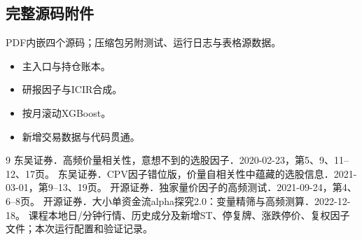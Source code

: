 \documentclass[UTF8,zihao=-4,fontset=fandol]{ctexart}
\begin{document}
\subsection*{完整源码附件}
PDF内嵌四个源码；压缩包另附测试、运行日志与表格源数据。
\begin{itemize}
\item {}\quad 主入口与持仓账本。
\item {}\quad 研报因子与ICIR合成。
\item {}\quad 按月滚动XGBoost。
\item {}\quad 新增交易数据与代码贯通。
\end{itemize}

\begin{thebibliography}{9}\small
{} 东吴证券．高频价量相关性，意想不到的选股因子．2020-02-23，第5、9、11--12、17页。
 东吴证券．CPV因子错位版，价量自相关性中蕴藏的选股信息．2021-03-01，第9--13、19页。
 开源证券．独家量价因子的高频测试．2021-09-24，第4、6--8页。
 开源证券．大小单资金流alpha探究2.0：变量精筛与高频测算．2022-12-18。
 课程本地日/分钟行情、历史成分及新增ST、停复牌、涨跌停价、复权因子文件；本次运行配置和验证记录。
\end{thebibliography}

\appendix

\end{document}
